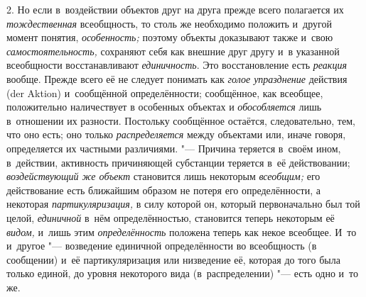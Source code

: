 2. Но если в~воздействии объектов друг на друга прежде всего
полагается их {\em тождественная}
всеобщность, то столь же необходимо положить и~другой момент
понятия, {\em особенность;}
поэтому объекты доказывают также и~свою
{\em самостоятельность,}
сохраняют себя как внешние друг другу и~в указанной
всеобщности восстанавливают
{\em единичность}. Это
восстановление есть {\em реакция}
вообще. Прежде всего её не следует понимать
как {\em голое упразднение}
действия (der Aktion) и~сообщённой
определённости; сообщённое, как всеобщее, положительно наличествует в
особенных объектах и {\em обособляется}
лишь в~отношении их разности. Постольку сообщённое остаётся,
следовательно, тем, что оно есть; оно только
{\em распределяется}
между объектами или, иначе говоря, определяется их частными
различиями. "--- Причина теряется в~своём ином, в~действии,
активность причиняющей субстанции теряется в~её действовании;
{\em воздействующий же объект}
становится лишь некоторым
{\em всеобщим;} его
действование есть ближайшим образом не потеря его определённости, а
некоторая {\em партикуляризация,}
в силу которой он, который первоначально был той целой,
{\em единичной} в~нём
определённостью, становится теперь некоторым её
{\em видом,} и~лишь этим
{\em определённость}
положена теперь как некое всеобщее. И~то и~другое
"--- возведение единичной определённости во всеобщность (в
сообщении) и~её партикуляризация или низведение её, которая до того была
только единой, до уровня некоторого вида (в~распределении)
"--- есть одно и~то
же.

